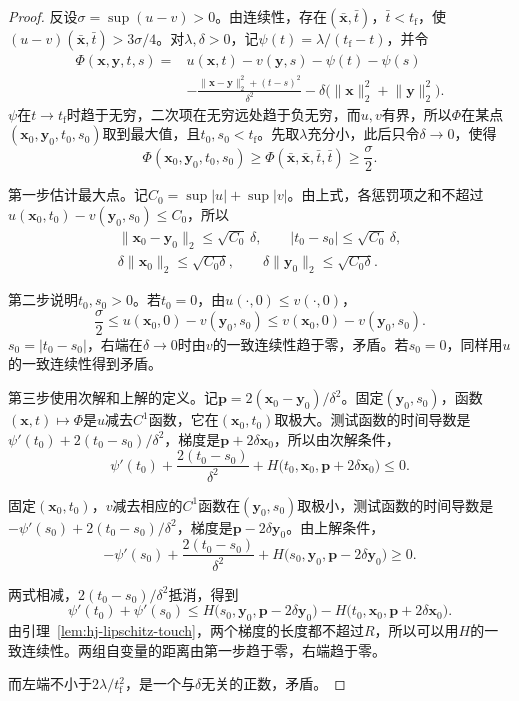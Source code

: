\begin{proof}
反设$\sigma=\sup(u-v)>0$。由连续性，存在$(\bar{\bm{x}},\bar{t})$，$\bar{t}<t_{\mathrm{f}}$，使$(u-v)(\bar{\bm{x}},\bar{t})>3\sigma/4$。对$\lambda,\delta>0$，记$\psi(t)=\lambda/(t_{\mathrm{f}}-t)$，并令
\[
  \begin{aligned}
    \Phi(\bm{x},\bm{y},t,s)={}&u(\bm{x},t)-v(\bm{y},s)-\psi(t)-\psi(s)\\
    &-\frac{\lVert\bm{x}-\bm{y}\rVert_2^2+(t-s)^2}{\delta^2}-\delta\bigl(\lVert\bm{x}\rVert_2^2+\lVert\bm{y}\rVert_2^2\bigr).
  \end{aligned}
\]
$\psi$在$t\to t_{\mathrm{f}}$时趋于无穷，二次项在无穷远处趋于负无穷，而$u,v$有界，所以$\Phi$在某点$(\bm{x}_0,\bm{y}_0,t_0,s_0)$取到最大值，且$t_0,s_0<t_{\mathrm{f}}$。先取$\lambda$充分小，此后只令$\delta\to0$，使得
\[
  \Phi(\bm{x}_0,\bm{y}_0,t_0,s_0)\geq\Phi(\bar{\bm{x}},\bar{\bm{x}},\bar{t},\bar{t})\geq\frac{\sigma}{2}.
\]

第一步估计最大点。记$C_0=\sup\lvert u\rvert+\sup\lvert v\rvert$。由上式，各惩罚项之和不超过$u(\bm{x}_0,t_0)-v(\bm{y}_0,s_0)\leq C_0$，所以
\[
  \begin{gathered}
    \lVert\bm{x}_0-\bm{y}_0\rVert_2\leq\sqrt{C_0}\,\delta,\qquad\lvert t_0-s_0\rvert\leq\sqrt{C_0}\,\delta,\\
    \delta\lVert\bm{x}_0\rVert_2\leq\sqrt{C_0\delta},\qquad\delta\lVert\bm{y}_0\rVert_2\leq\sqrt{C_0\delta}.
  \end{gathered}
\]

第二步说明$t_0,s_0>0$。若$t_0=0$，由$u(\cdot,0)\leq v(\cdot,0)$，
\[
  \frac{\sigma}{2}\leq u(\bm{x}_0,0)-v(\bm{y}_0,s_0)\leq v(\bm{x}_0,0)-v(\bm{y}_0,s_0).
\]
$s_0=\lvert t_0-s_0\rvert$，右端在$\delta\to0$时由$v$的一致连续性趋于零，矛盾。若$s_0=0$，同样用$u$的一致连续性得到矛盾。

第三步使用次解和上解的定义。记$\bm{p}=2(\bm{x}_0-\bm{y}_0)/\delta^2$。固定$(\bm{y}_0,s_0)$，函数$(\bm{x},t)\mapsto\Phi$是$u$减去$C^1$函数，它在$(\bm{x}_0,t_0)$取极大。测试函数的时间导数是$\psi'(t_0)+2(t_0-s_0)/\delta^2$，梯度是$\bm{p}+2\delta\bm{x}_0$，所以由次解条件，
\[
  \psi'(t_0)+\frac{2(t_0-s_0)}{\delta^2}+H\bigl(t_0,\bm{x}_0,\bm{p}+2\delta\bm{x}_0\bigr)\leq0.
\]

固定$(\bm{x}_0,t_0)$，$v$减去相应的$C^1$函数在$(\bm{y}_0,s_0)$取极小，测试函数的时间导数是$-\psi'(s_0)+2(t_0-s_0)/\delta^2$，梯度是$\bm{p}-2\delta\bm{y}_0$。由上解条件，
\[
  -\psi'(s_0)+\frac{2(t_0-s_0)}{\delta^2}+H\bigl(s_0,\bm{y}_0,\bm{p}-2\delta\bm{y}_0\bigr)\geq0.
\]

两式相减，$2(t_0-s_0)/\delta^2$抵消，得到
\[
  \psi'(t_0)+\psi'(s_0)\leq H\bigl(s_0,\bm{y}_0,\bm{p}-2\delta\bm{y}_0\bigr)-H\bigl(t_0,\bm{x}_0,\bm{p}+2\delta\bm{x}_0\bigr).
\]
由引理~\ref{lem:hj-lipschitz-touch}，两个梯度的长度都不超过$R$，所以可以用$H$的一致连续性。两组自变量的距离由第一步趋于零，右端趋于零。

而左端不小于$2\lambda/t_{\mathrm{f}}^2$，是一个与$\delta$无关的正数，矛盾。
\end{proof}

